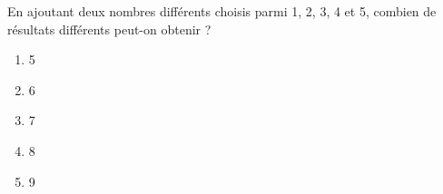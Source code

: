  En ajoutant deux nombres différents choisis parmi 1, 2, 3, 4 et 5, combien de résultats
différents peut-on obtenir ?
\begin{multicols}{5}
  \begin{enumerate}[A/]
  \item 5
  \item 6
  \item 7
  \item 8
  \item 9
  \end{enumerate}
\end{multicols}
